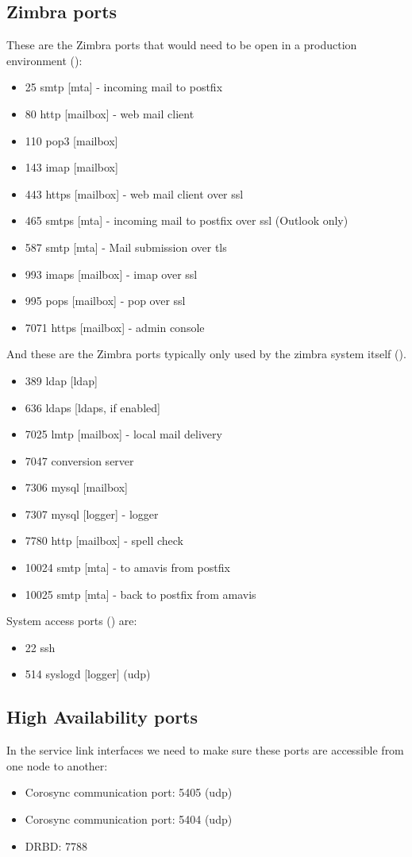 \subsection {Zimbra ports}
These are the Zimbra ports that would need to be open in a production environment (\cite{ZimbraWikiPorts}):
\begin{itemize}
  \item 25 smtp [mta] - incoming mail to postfix
  \item 80 http [mailbox] - web mail client
  \item 110 pop3 [mailbox]
  \item 143 imap [mailbox]
  \item 443 https [mailbox] - web mail client over ssl
  \item 465 smtps [mta] - incoming mail to postfix over ssl (Outlook only)
  \item 587 smtp [mta] - Mail submission over tls
  \item 993 imaps [mailbox] - imap over ssl
  \item 995 pops [mailbox] - pop over ssl
  \item 7071 https [mailbox] - admin console
\end{itemize}
And these are the Zimbra ports typically only used by the zimbra system itself (\cite{ZimbraWikiPorts}).
\begin{itemize}
  \item 389 ldap [ldap]
  \item 636 ldaps [ldaps, if enabled]
  \item 7025 lmtp [mailbox] - local mail delivery
  \item 7047 conversion server
  \item 7306 mysql [mailbox]
  \item 7307 mysql [logger] - logger
  \item 7780 http [mailbox] - spell check
  \item 10024 smtp [mta] - to amavis from postfix
  \item 10025 smtp [mta] - back to postfix from amavis
\end{itemize}
System access ports (\cite{ZimbraWikiPorts}) are:
\begin{itemize}
  \item 22 ssh
  \item 514 syslogd [logger] (udp)
\end{itemize}

\subsection {High Availability ports}
In the service link interfaces we need to make sure these ports are accessible from one node to another:
\begin{itemize}
  \item Corosync communication port: 5405 (udp)
  \item Corosync communication port: 5404 (udp)
  \item DRBD: 7788
\end{itemize}


